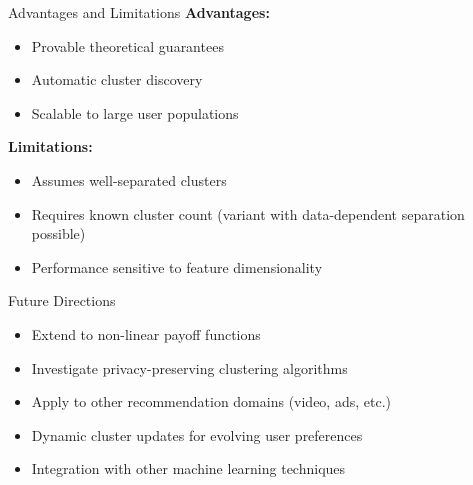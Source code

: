 \documentclass[11pt]{beamer}
\begin{document}
\begin{frame}{Advantages and Limitations}
  \textbf{Advantages:}
  \begin{itemize}
    \item Provable theoretical guarantees
    \item Automatic cluster discovery
    \item Scalable to large user populations
  \end{itemize}
  
  \textbf{Limitations:}
  \begin{itemize}
    \item Assumes well-separated clusters
    \item Requires known cluster count (variant with data-dependent separation possible)
    \item Performance sensitive to feature dimensionality
  \end{itemize}
\end{frame}

\begin{frame}{Future Directions}
  \begin{itemize}
    \item Extend to non-linear payoff functions
    \item Investigate privacy-preserving clustering algorithms
    \item Apply to other recommendation domains (video, ads, etc.)
    \item Dynamic cluster updates for evolving user preferences
    \item Integration with other machine learning techniques
  \end{itemize}
\end{frame}











\end{document}
